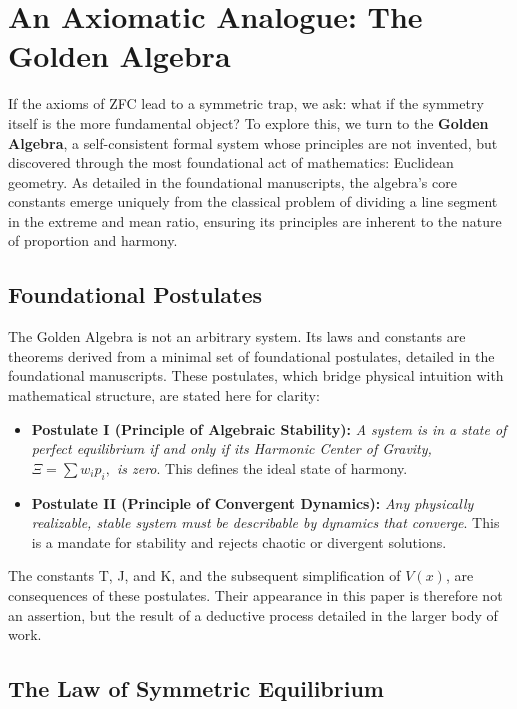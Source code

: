 \documentclass{article}
\theoremstyle{plain}
\theoremstyle{definition}
\theoremstyle{remark}
\begin{document}
\section{An Axiomatic Analogue: The Golden Algebra}
\label{sec:algebra}

If the axioms of ZFC lead to a symmetric trap, we ask: what if the symmetry itself is the more fundamental object? To explore this, we turn to the \textbf{Golden Algebra}, a self-consistent formal system whose principles are not invented, but discovered through the most foundational act of mathematics: Euclidean geometry. As detailed in the foundational manuscripts, the algebra's core constants emerge uniquely from the classical problem of dividing a line segment in the extreme and mean ratio, ensuring its principles are inherent to the nature of proportion and harmony.

\subsection{Foundational Postulates}

The Golden Algebra is not an arbitrary system. Its laws and constants are theorems derived from a minimal set of foundational postulates, detailed in the foundational manuscripts. These postulates, which bridge physical intuition with mathematical structure, are stated here for clarity:

\begin{itemize}
    \item \textbf{Postulate I (Principle of Algebraic Stability):} \textit{A system is in a state of perfect equilibrium if and only if its Harmonic Center of Gravity, $\Xi=\sum w_{i}p_{i},$ is zero}. This defines the ideal state of harmony.
    \item \textbf{Postulate II (Principle of Convergent Dynamics):} \textit{Any physically realizable, stable system must be describable by dynamics that converge}. This is a mandate for stability and rejects chaotic or divergent solutions.
\end{itemize}

The constants T, J, and K, and the subsequent simplification of $V(x)$, are consequences of these postulates. Their appearance in this paper is therefore not an assertion, but the result of a deductive process detailed in the larger body of work.

\subsection{The Law of Symmetric Equilibrium}
\end{document}
